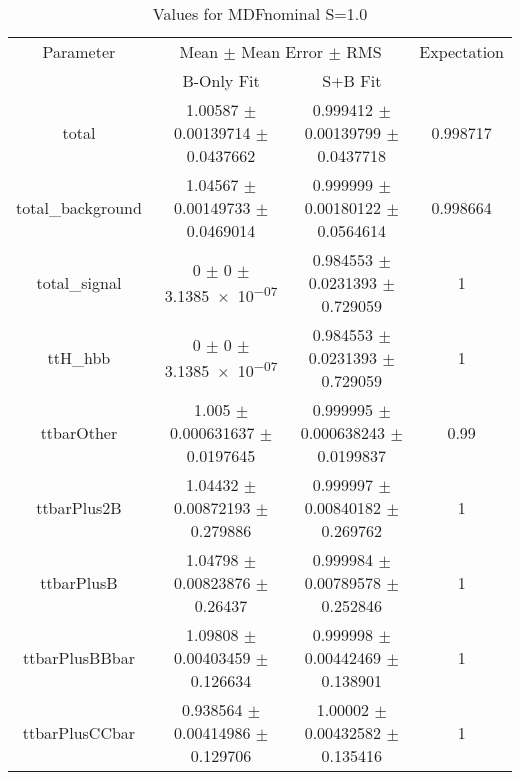 \begin{table}
\centering
\caption{Values for MDFnominal S=1.0}
\begin{tabular}{cccc}
\toprule
Parameter & \multicolumn{2}{c}{Mean $\pm$ Mean Error $\pm$ RMS} & Expectation\\
 & B-Only Fit & S+B Fit & \\
\midrule
total & \num{1.00587} $\pm$ \num{0.00139714} $\pm$ \num{0.0437662} & \num{0.999412} $\pm$ \num{0.00139799} $\pm$ \num{0.0437718} & \num{0.998717}\\
total\_background & \num{1.04567} $\pm$ \num{0.00149733} $\pm$ \num{0.0469014} & \num{0.999999} $\pm$ \num{0.00180122} $\pm$ \num{0.0564614} & \num{0.998664}\\
total\_signal & \num{0} $\pm$ \num{0} $\pm$ \num{3.1385e-07} & \num{0.984553} $\pm$ \num{0.0231393} $\pm$ \num{0.729059} & \num{1}\\
ttH\_hbb & \num{0} $\pm$ \num{0} $\pm$ \num{3.1385e-07} & \num{0.984553} $\pm$ \num{0.0231393} $\pm$ \num{0.729059} & \num{1}\\
ttbarOther & \num{1.005} $\pm$ \num{0.000631637} $\pm$ \num{0.0197645} & \num{0.999995} $\pm$ \num{0.000638243} $\pm$ \num{0.0199837} & \num{0.99}\\
ttbarPlus2B & \num{1.04432} $\pm$ \num{0.00872193} $\pm$ \num{0.279886} & \num{0.999997} $\pm$ \num{0.00840182} $\pm$ \num{0.269762} & \num{1}\\
ttbarPlusB & \num{1.04798} $\pm$ \num{0.00823876} $\pm$ \num{0.26437} & \num{0.999984} $\pm$ \num{0.00789578} $\pm$ \num{0.252846} & \num{1}\\
ttbarPlusBBbar & \num{1.09808} $\pm$ \num{0.00403459} $\pm$ \num{0.126634} & \num{0.999998} $\pm$ \num{0.00442469} $\pm$ \num{0.138901} & \num{1}\\
ttbarPlusCCbar & \num{0.938564} $\pm$ \num{0.00414986} $\pm$ \num{0.129706} & \num{1.00002} $\pm$ \num{0.00432582} $\pm$ \num{0.135416} & \num{1}\\
\bottomrule
\end{tabular}
\end{table}